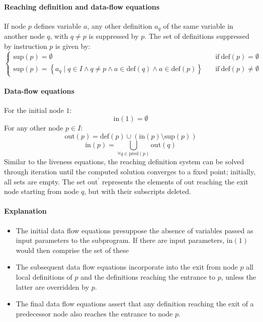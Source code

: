 \paragraph*{Reaching definition and data-flow equations}
If node $p$ defines variable $a$, any other definition $a_q$ of the same variable in another node $q$, with $q \neq p$ is suppressed by $p$.
The set of definitions suppressed by instruction $p$ is given by:
\[
\begin{cases}
    \text{sup}(p) = \emptyset \quad                                                                                             & \text{if} \ \text{def}(p) = \emptyset    \\
    \text{sup}(p) = \left\{ a_q \mid q \in I \land q \neq p \land a \in \text{def} (q) \land a \in \text{def}(p) \right\} \quad & \text{if} \ \text{def}(p) \neq \emptyset
\end{cases}
\]

\paragraph*{Data-flow equations}
For the initial node $1$:
\[\text{in}(1) = \emptyset\]
For any other node $p \in I$:
\[\text{out}(p) = \text{def}(p) \cup \left( \text{in}(p) \setminus \text{sup}(p) \right)\]
\[\text{in}(p) = \bigcup_{\forall q \in  \text{pred}(p)} \text{out}(q)\]
Similar to the liveness equations, the reaching definition system can be solved through iteration until the computed solution converges to a fixed point; initially, all sets are empty. 
The set $\text{out}^{\prime}$ represents the elements of $\text{out}$ reaching the exit node starting from node $q$, but with their subscripts deleted.

\paragraph*{Explanation}
\begin{itemize}
    \item The initial data flow equations presuppose the absence of variables passed as input parameters to the subprogram.
        If there are input parameters, $\text{in}(1)$ would then comprise the set of these 
    \item The subsequent data flow equations incorporate into the exit from node $p$ all local definitions of $p$ and the definitions reaching the entrance to $p$, unless the latter are overridden by $p$.
    \item The final data flow equations assert that any definition reaching the exit of a predecessor node also reaches the entrance to node $p$.
\end{itemize}


